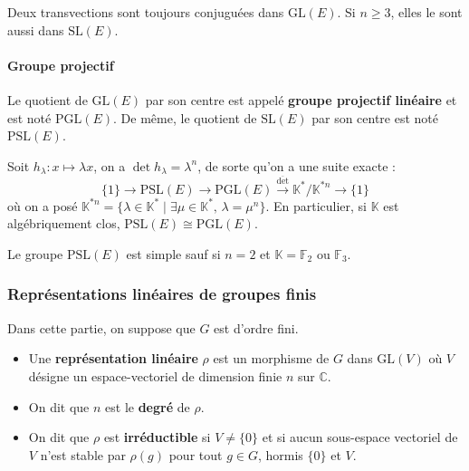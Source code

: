 	\begin{proposition}
		Deux transvections sont toujours conjuguées dans $\mathrm{GL}(E)$. Si $n \geq 3$, elles le sont aussi dans $\mathrm{SL}(E)$.
	\end{proposition}
	
	\paragraph{Groupe projectif}
	
	\begin{definition}
		Le quotient de $\mathrm{GL}(E)$ par son centre est appelé \textbf{groupe projectif linéaire} et est noté $\mathrm{PGL}(E)$. De même, le quotient de $\mathrm{SL}(E)$ par son centre est noté $\mathrm{PSL}(E)$.
	\end{definition}
	
	\begin{remark}
		Soit $h_\lambda : x \mapsto \lambda x$, on a $\det h_\lambda = \lambda^n$, de sorte qu'on a une suite exacte :
		\[ \{ 1 \} \rightarrow \mathrm{PSL}(E) \rightarrow \mathrm{PGL}(E) \xrightarrow{\overline{\det}} \mathbb{K}^*/\mathbb{K}^{*n} \rightarrow \{ 1 \} \]
		où on a posé $\mathbb{K}^{*n} = \{ \lambda \in \mathbb{K}^* \mid \exists \mu \in \mathbb{K}^*, \, \lambda = \mu^n \}$. En particulier, si $\mathbb{K}$ est algébriquement clos, $\mathrm{PSL}(E) \cong \mathrm{PGL}(E)$.
	\end{remark}
	
	\begin{theorem}
		Le groupe $\mathrm{PSL}(E)$ est simple sauf si $n = 2$ et $\mathbb{K} = \mathbb{F}_2$ ou $\mathbb{F}_3$.
	\end{theorem}
	
	\subsubsection{Représentations linéaires de groupes finis}
	
	
	Dans cette partie, on suppose que $G$ est d'ordre fini.
	
	\begin{definition}
		\begin{itemize}
			\item Une \textbf{représentation linéaire} $\rho$ est un morphisme de $G$ dans $\mathrm{GL}(V)$ où $V$ désigne un espace-vectoriel de dimension finie $n$ sur $\mathbb{C}$.
			\item On dit que $n$ est le \textbf{degré} de $\rho$.
			\item On dit que $\rho$ est \textbf{irréductible} si $V \neq \{ 0 \}$ et si aucun sous-espace vectoriel de $V$ n'est stable par $\rho(g)$ pour tout $g \in G$, hormis $\{ 0 \}$ et $V$.
		\end{itemize}
	\end{definition}
	
